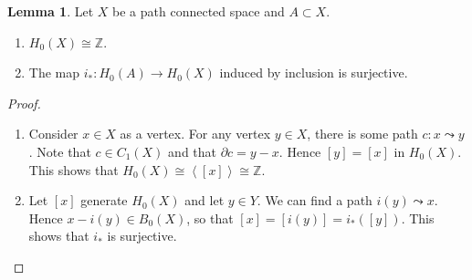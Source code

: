 \documentclass[10pt,letterpaper,cm]{nupset}
\theoremstyle{definition}
\theoremstyle{theorem}
\newtheorem{lemma}[definition]{Lemma}
\theoremstyle{remark}
\newcommand{\Z}{\mathbb Z}
\newcommand{\1}{\mathbb{1}}
\newcommand{\0}{\vec 0}
\begin{document}
\begin{lemma}\label{l21} Let $X$ be a path connected space and $A\subset X$.
\begin{enumerate}
\item $H_0(X) \cong \Z$.
\item The map $i_{\ast}: H_0(A) \to H_0(X)$ induced by inclusion is surjective. 
\end{enumerate}
\end{lemma}
\begin{proof} $ $
\begin{enumerate} 
\item Consider $x\in X$ as a vertex. For any vertex $y\in X$, there is some path $c: x\leadsto y$. Note that $c \in C_1(X)$ and that $\partial{c}= y-x$. Hence $\left[y\right]= \left[x\right]$ in $H_0(X)$. This shows that $H_0(X) \cong \left\langle \left[x\right] \right\rangle \cong \Z$.
\item Let $[x]$ generate $H_0(X)$ and let $y\in Y$. We can find a path $i(y) \leadsto x$. Hence $x-i(y)\in B_0(X)$, so that $[x] =\left[i(y)\right]= i_{\ast}([y])$. This shows that $i_{\ast}$ is surjective.
\end{enumerate}
\end{proof}
\end{document}

